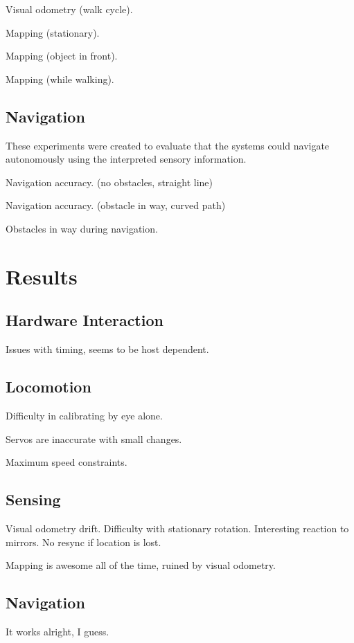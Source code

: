 Visual odometry (walk cycle).

Mapping (stationary).

Mapping (object in front).

Mapping (while walking).

\subsection{Navigation}

These experiments were created to evaluate that the systems could navigate autonomously using the interpreted sensory information.

Navigation accuracy. (no obstacles, straight line)

Navigation accuracy. (obstacle in way, curved path)

Obstacles in way during navigation.

\section{Results}

\subsection{Hardware Interaction}

Issues with timing, seems to be host dependent.

\subsection{Locomotion}

Difficulty in calibrating by eye alone. 

Servos are inaccurate with small changes.

Maximum speed constraints.

\subsection{Sensing}

Visual odometry drift. Difficulty with stationary rotation. Interesting reaction to mirrors. No resync if location is lost.

Mapping is awesome all of the time, ruined by visual odometry.

\subsection{Navigation}

It works alright, I guess.
